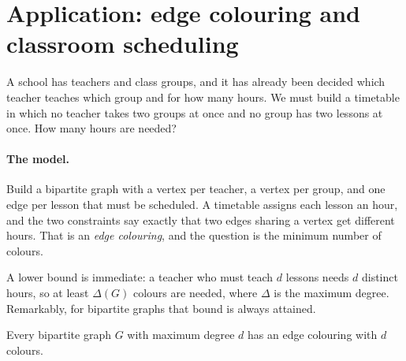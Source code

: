 \section{Application: edge colouring and classroom scheduling}
\label{sec:matching-edge-colouring}

A school has teachers and class groups, and it has already been decided which
teacher teaches which group and for how many hours. We must build a timetable
in which no teacher takes two groups at once and no group has two lessons at
once. How many hours are needed?

\paragraph{The model.} Build a bipartite graph with a vertex per teacher, a
vertex per group, and one edge per lesson that must be scheduled. A timetable
assigns each lesson an hour, and the two constraints say exactly that two edges
sharing a vertex get different hours. That is an \emph{edge colouring}, and the
question is the minimum number of colours.

A lower bound is immediate: a teacher who must teach $d$ lessons needs $d$
distinct hours, so at least $\Delta(G)$ colours are needed, where $\Delta$ is
the maximum degree. Remarkably, for bipartite graphs that bound is always
attained.

\begin{theorem}\label{thm:matching-edge-colouring}
Every bipartite graph $G$ with maximum degree $d$ has an edge colouring with $d$
colours.
\end{theorem}

